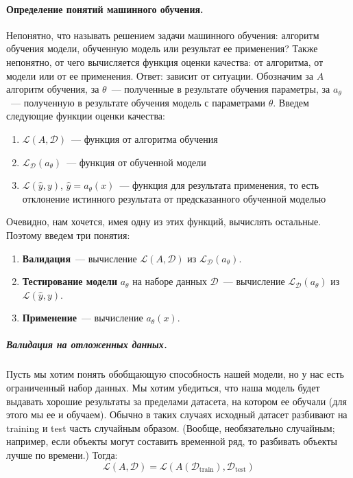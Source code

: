 \documentclass{article}
\begin{document}
    \paragraph{Определение понятий машинного обучения.}
    Непонятно, что называть решением задачи машинного обучения: алгоритм обучения модели, обученную модель или результат ее применения? Также непонятно, от чего вычисляется функция оценки качества: от алгоритма, от модели или от ее применения. Ответ: зависит от ситуации. Обозначим за $A$ алгоритм обучения, за $\theta$~--- полученные в результате обучения параметры, за $a_{\theta}$~--- полученную в результате обучения модель с параметрами $\theta$. Введем следующие функции оценки качества:
    \begin{enumerate}
        \item $\mathcal{L}(A,\mathcal{D})$~--- функция от алгоритма обучения
        \item $\mathcal{L}_{\mathcal{D}}(a_{\theta})$~--- функция от обученной модели
        \item $\mathcal{L}(\widehat{y},y)$, $\widehat{y}=a_{\theta}(x)$~--- функция для результата применения, то есть отклонение истинного результата от предсказанного обученной моделью
    \end{enumerate}
    Очевидно, нам хочется, имея одну из этих функций, вычислять остальные. Поэтому введем три понятия:
    \begin{enumerate}
        \item \textbf{Валидация}~--- вычисление $\mathcal{L}(A,\mathcal{D})$ из $\mathcal{L}_{\mathcal{D}}(a_{\theta})$.
        \item \textbf{Тестирование модели} $a_{\theta}$ на наборе данных $\mathcal{D}$~--- вычисление $\mathcal{L}_{\mathcal{D}}(a_{\theta})$ из $\mathcal{L}(\widehat{y},y)$.
        \item \textbf{Применение}~--- вычисление $a_{\theta}(x)$.
    \end{enumerate}
    \subparagraph{Валидация на отложенных данных.}
    Пусть мы хотим понять обобщающую способность нашей модели, но у нас есть ограниченный набор данных. Мы хотим убедиться, что наша модель будет выдавать хорошие результаты за пределами датасета, на котором ее обучали (для этого мы ее и обучаем). Обычно в таких случаях исходный датасет разбивают на training и test часть случайным образом. (Вообще, необязательно случайным; например, если объекты могут составить временной ряд, то разбивать объекты лучше по времени.) Тогда:
    \[\mathcal{L}(A,\mathcal{D})=\mathcal{L}(A(\mathcal{D}_{\mathrm{train}}),\mathcal{D}_{\mathrm{test}})\]
\end{document}
